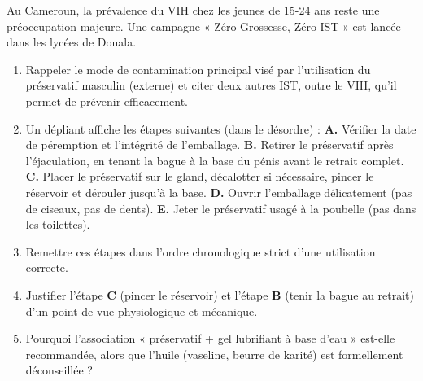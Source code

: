 \documentclass[11pt]{article}
\begin{document}
\begin{exercice}
Au Cameroun, la prévalence du VIH chez les jeunes de 15-24 ans reste une préoccupation majeure. Une campagne « Zéro Grossesse, Zéro IST » est lancée dans les lycées de Douala.
\begin{enumerate}
    \item Rappeler le mode de contamination principal visé par l'utilisation du préservatif masculin (externe) et citer deux autres IST, outre le VIH, qu'il permet de prévenir efficacement.
    \item Un dépliant affiche les étapes suivantes (dans le désordre) : \textbf{A.} Vérifier la date de péremption et l'intégrité de l'emballage. \textbf{B.} Retirer le préservatif après l'éjaculation, en tenant la bague à la base du pénis avant le retrait complet. \textbf{C.} Placer le préservatif sur le gland, décalotter si nécessaire, pincer le réservoir et dérouler jusqu'à la base. \textbf{D.} Ouvrir l'emballage délicatement (pas de ciseaux, pas de dents). \textbf{E.} Jeter le préservatif usagé à la poubelle (pas dans les toilettes).
    \item Remettre ces étapes dans l'ordre chronologique strict d'une utilisation correcte.
    \item Justifier l'étape \textbf{C} (pincer le réservoir) et l'étape \textbf{B} (tenir la bague au retrait) d'un point de vue physiologique et mécanique.
    \item Pourquoi l'association « préservatif + gel lubrifiant à base d'eau » est-elle recommandée, alors que l'huile (vaseline, beurre de karité) est formellement déconseillée ?
\end{enumerate}
\end{exercice}
\end{document}

